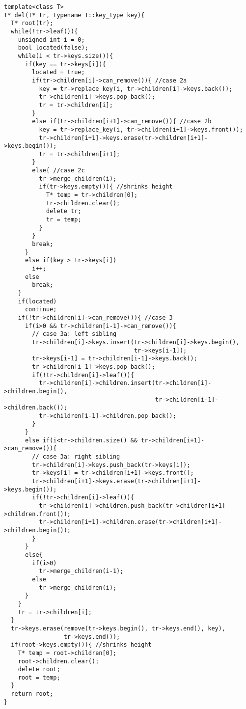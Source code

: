 \documentclass{article}
\begin{document}
\begin{lstlisting}
template<class T>
T* del(T* tr, typename T::key_type key){
  T* root(tr);
  while(!tr->leaf()){
    unsigned int i = 0;
    bool located(false);
    while(i < tr->keys.size()){
      if(key == tr->keys[i]){
        located = true;
        if(tr->children[i]->can_remove()){ //case 2a
          key = tr->replace_key(i, tr->children[i]->keys.back());
          tr->children[i]->keys.pop_back();
          tr = tr->children[i];
        }
        else if(tr->children[i+1]->can_remove()){ //case 2b
          key = tr->replace_key(i, tr->children[i+1]->keys.front());
          tr->children[i+1]->keys.erase(tr->children[i+1]->keys.begin());
          tr = tr->children[i+1];
        }
        else{ //case 2c
          tr->merge_children(i);
          if(tr->keys.empty()){ //shrinks height
            T* temp = tr->children[0];
            tr->children.clear();
            delete tr;
            tr = temp;
          }
        }
        break;
      }
      else if(key > tr->keys[i])
        i++;
      else
        break;
    }
    if(located)
      continue;
    if(!tr->children[i]->can_remove()){ //case 3
      if(i>0 && tr->children[i-1]->can_remove()){
        // case 3a: left sibling
        tr->children[i]->keys.insert(tr->children[i]->keys.begin(),
                                     tr->keys[i-1]);
        tr->keys[i-1] = tr->children[i-1]->keys.back();
        tr->children[i-1]->keys.pop_back();
        if(!tr->children[i]->leaf()){
          tr->children[i]->children.insert(tr->children[i]->children.begin(),
                                           tr->children[i-1]->children.back());
          tr->children[i-1]->children.pop_back();
        }
      }
      else if(i<tr->children.size() && tr->children[i+1]->can_remove()){
        // case 3a: right sibling
        tr->children[i]->keys.push_back(tr->keys[i]);
        tr->keys[i] = tr->children[i+1]->keys.front();
        tr->children[i+1]->keys.erase(tr->children[i+1]->keys.begin());
        if(!tr->children[i]->leaf()){
          tr->children[i]->children.push_back(tr->children[i+1]->children.front());
          tr->children[i+1]->children.erase(tr->children[i+1]->children.begin());
        }
      }
      else{
        if(i>0)
          tr->merge_children(i-1);
        else
          tr->merge_children(i);
      }
    }
    tr = tr->children[i];
  }
  tr->keys.erase(remove(tr->keys.begin(), tr->keys.end(), key),
                 tr->keys.end());
  if(root->keys.empty()){ //shrinks height
    T* temp = root->children[0];
    root->children.clear();
    delete root;
    root = temp;
  }
  return root;
}
\end{lstlisting}
\end{document}
